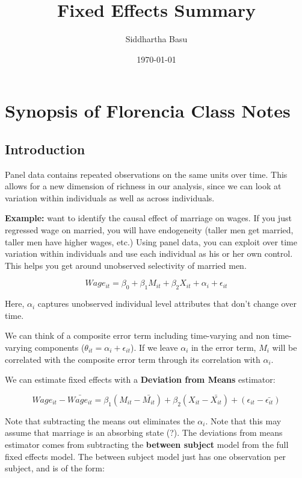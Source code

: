 \documentclass[12 pt, leqno]{article}
\begin{document}
\title{Fixed Effects Summary}
\author{Siddhartha Basu}
\date{\today}
\maketitle


\section{Synopsis of Florencia Class Notes}

\subsection{Introduction}
Panel data contains repeated observations on the same units over time. This allows for a new dimension of richness in our analysis, since we can look at variation within individuals as well as across individuals. 

\textbf{Example:} want to identify the causal effect of marriage on wages. If you just regressed wage on married, you will have endogeneity (taller men get married, taller men have higher wages, etc.) Using panel data, you can exploit over time variation within individuals and use each individual as his or her own control. This helps you get around unobserved selectivity of married men.

$$ Wage_{it} = \beta_0 + \beta_1 M_{it} + \beta_2 X_{it} + \alpha_i + \epsilon_{it}$$

Here, $\alpha_i$ captures unobserved individual level attributes that don't change over time. 

We can think of a composite error term including time-varying and non time-varying components ($\theta_{it} = \alpha_i + \epsilon_{it}$). If we leave $\alpha_i$ in the error term, $M_i$ will be correlated with the composite error term through its correlation with $\alpha_i$.

We can estimate fixed effects with a \textbf{Deviation from Means} estimator:

$$Wage_{it} - \bar{Wage_{it}} = \beta_1 (M_{it} - \bar{M_{it}}) + \beta_2 (X_{it} - \bar{X_{it}}) + (\epsilon_{it} - \bar{\epsilon_{it}})$$

Note that subtracting the means out eliminates the $\alpha_i$. Note that this may assume that marriage is an absorbing state (?). The deviations from means estimator comes from subtracting the \textbf{between subject} model from the full fixed effects model. The between subject model just has one observation per subject, and is of the form:
\end{document}
